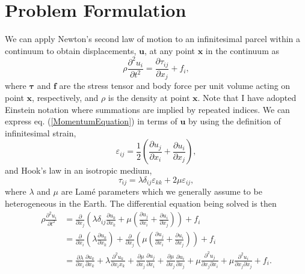 \documentclass[12pt]{article}
\begin{document}
\section*{Problem Formulation}
We can apply Newton's second law of motion to an infinitesimal parcel
within a continuum to obtain displacements, $\boldsymbol{u}$,
at any point $\boldsymbol{x}$ in the continuum as
\begin{equation}\label{MomentumEquation}
  \rho\frac{\partial^2 u_i}{\partial t^2}  = \frac{\partial \tau_{ij}}{\partial x_j} + f_i,
\end{equation}
where $\boldsymbol{\tau}$ and $\boldsymbol{f}$ are the stress tensor
and body force per unit volume acting on point $\boldsymbol{x}$,
respectively, and $\rho$ is the density at point
$\boldsymbol{x}$. Note that I have adopted Einstein notation where
summations are implied by repeated indices.  We can express
eq. (\ref{MomentumEquation}) in terms of $\boldsymbol{u}$ by using the
definition of infinitesimal strain,
\begin{equation}\label{Strain}
  \varepsilon_{ij} = \frac{1}{2}\left(\frac{\partial u_j}{\partial x_i} + 
                                \frac{\partial u_i}{\partial x_j}\right),
\end{equation}
and Hook's law in an isotropic medium,
\begin{equation}\label{HooksLaw}
  \tau_{ij} = \lambda\delta_{ij}\varepsilon_{kk} + 2\mu\varepsilon_{ij},
\end{equation}
where $\lambda$ and $\mu$ are Lam\'e parameters which we generally
assume to be heterogeneous in the Earth.  The differential equation
being solved is then
\begin{align}\label{DiffEq}
  \rho\frac{\partial^2 u_i}{\partial t^2} &= 
    \frac{\partial}{\partial x_j}\left(\lambda\delta_{ij}\frac{\partial u_k}{\partial x_k} +
    \mu\left(\frac{\partial u_j}{\partial x_i} + \frac{\partial
    u_i}{\partial x_j}\right)\right) + f_i\\\nonumber
  &= 
    \frac{\partial}{\partial x_i}\left(\lambda\frac{\partial u_k}{\partial x_k}\right) +
    \frac{\partial}{\partial x_j}\left(\mu\left(\frac{\partial u_j}{\partial x_i} + \frac{\partial
    u_i}{\partial x_j}\right)\right) + f_i\\\nonumber
  &= 
    \frac{\partial \lambda}{\partial x_i}
    \frac{\partial u_k}{\partial x_k} +
    \lambda\frac{\partial^2 u_k}{\partial x_i x_k} +
    \frac{\partial \mu}{\partial x_j}\frac{\partial u_j}{\partial x_i} +
    \frac{\partial \mu}{\partial x_j}\frac{\partial u_i}{\partial x_j} +
    \mu\frac{\partial^2 u_j}{\partial x_j \partial x_i} + 
    \mu\frac{\partial^2 u_i}{\partial x_j \partial x_j} + f_i.
\end{align}
\end{document}
